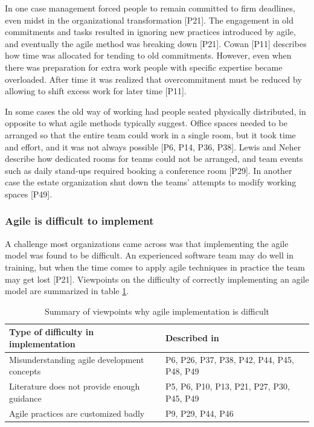 In one case management forced people to remain committed to firm deadlines, even
midst in the organizational transformation [P21]. The engagement in old
commitments and tasks resulted in ignoring new practices introduced by agile,
and eventually the agile method was breaking down [P21].
Cowan [P11] describes how time was allocated for tending to old commitments.
However, even when there was preparation for extra work people with specific
expertise became overloaded. After time it was realized that overcommitment must
be reduced by allowing to shift excess work for later time [P11].



In some cases the old way of working had people seated physically distributed,
in opposite to what agile methods typically suggest. Office spaces needed to be
arranged so that the entire team could work in a single room, but it took time
and effort, and it was not always possible [P6, P14, P36, P38]. Lewis and Neher
describe how dedicated rooms for teams could not be arranged, and team events
such as daily stand-ups required booking a conference room [P29]. In another
case the estate organization shut down the teams' attempts to modify working
spaces [P49].


\subsubsection{Agile is difficult to implement}

A challenge most organizations came across was that implementing the agile model
was found to be difficult. An experienced software team may do well in training,
but when the time comes to apply agile techniques in practice the team may get
lost [P21]. Viewpoints on the difficulty of correctly implementing an agile
model are summarized in table \ref{table:challenges_difficulty}.


\begin{table}
    \centering
    \begin{tabular}{ >{\raggedright\arraybackslash}p{}
                     >{\raggedright\arraybackslash}p{} }
        \toprule
        Type of difficulty in implementation  &  Described in \\
        \midrule
        Misunderstanding agile development concepts  &
                P6, P26, P37, P38, P42, P44, P45, P48, P49      \\
        Literature does not provide enough guidance  &
                P5, P6, P10, P13, P21, P27, P30, P45, P49     \\
        Agile practices are customized badly   &
                P9, P29, P44, P46  \\
        \bottomrule
    \end{tabular}
    \caption{Summary of viewpoints why agile implementation is difficult}
    \label{table:challenges_difficulty}
\end{table}


